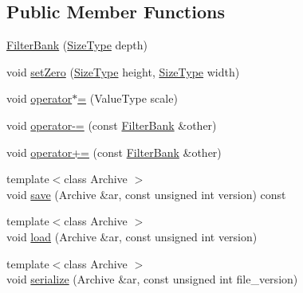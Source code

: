\subsection*{Public Member Functions}
\begin{DoxyCompactItemize}
\item 
\hyperlink{structffnn_1_1layer_1_1internal_1_1_filter_bank_a4d75e085abf6a011065dd8f2293c7d52}{Filter\-Bank} (\hyperlink{structffnn_1_1layer_1_1internal_1_1_filter_bank_af9efd4275b52c4222e82cfa9f6514ebb}{Size\-Type} depth)
\item 
void \hyperlink{structffnn_1_1layer_1_1internal_1_1_filter_bank_af7316658f5561b9b5072334797469aae}{set\-Zero} (\hyperlink{structffnn_1_1layer_1_1internal_1_1_filter_bank_af9efd4275b52c4222e82cfa9f6514ebb}{Size\-Type} height, \hyperlink{structffnn_1_1layer_1_1internal_1_1_filter_bank_af9efd4275b52c4222e82cfa9f6514ebb}{Size\-Type} width)
\item 
void \hyperlink{structffnn_1_1layer_1_1internal_1_1_filter_bank_a4f8ee142abb1eed7c2900dcf4ed2cf81}{operator$\ast$=} (Value\-Type scale)
\item 
void \hyperlink{structffnn_1_1layer_1_1internal_1_1_filter_bank_a30f3e17fa8e9d2c7929ebe0f53a618c2}{operator-\/=} (const \hyperlink{structffnn_1_1layer_1_1internal_1_1_filter_bank}{Filter\-Bank} \&other)
\item 
void \hyperlink{structffnn_1_1layer_1_1internal_1_1_filter_bank_a0dd94ecfabf95cdbb34d7b1c452e70e0}{operator+=} (const \hyperlink{structffnn_1_1layer_1_1internal_1_1_filter_bank}{Filter\-Bank} \&other)
\item 
{\footnotesize template$<$class Archive $>$ }\\void \hyperlink{structffnn_1_1layer_1_1internal_1_1_filter_bank_aca6d00c46bd207b2bb73721b576f5ebf}{save} (Archive \&ar, const unsigned int version) const 
\item 
{\footnotesize template$<$class Archive $>$ }\\void \hyperlink{structffnn_1_1layer_1_1internal_1_1_filter_bank_a26cd643880e6ff3208e7b960ac235dfe}{load} (Archive \&ar, const unsigned int version)
\item 
{\footnotesize template$<$class Archive $>$ }\\void \hyperlink{structffnn_1_1layer_1_1internal_1_1_filter_bank_aab5f207b22dca60b4a5ba9a9f183db8b}{serialize} (Archive \&ar, const unsigned int file\-\_\-version)
\end{DoxyCompactItemize}


